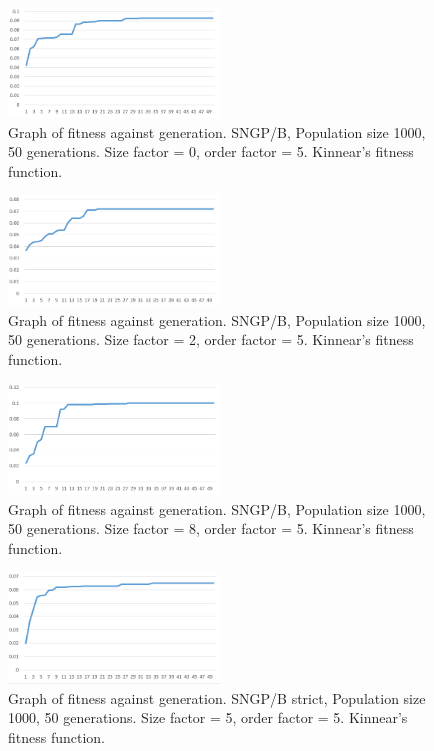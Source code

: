 \documentclass{article}
\begin{document}
    	\begin{figure}[H]
    		\centering
    		\includegraphics[width=0.5\textwidth]{g_sngpb_kinnear_SF0}
    		\caption{Graph of fitness against generation. SNGP/B, Population size 1000, 50 generations. Size factor = 0, order factor = 5. Kinnear's fitness function.}
    		\label{g:sngpb_kinnear_sf0}
    	\end{figure}
    
    	\begin{figure}[H]
    		\centering
    		\includegraphics[width=0.5\textwidth]{g_sngpb_kinnear_sf2}
    		\caption{Graph of fitness against generation. SNGP/B, Population size 1000, 50 generations. Size factor = 2, order factor = 5. Kinnear's fitness function.}
    		\label{g:sngpb_kinnear_sf2}
    	\end{figure}
    
    	\begin{figure}[H]
    		\centering
    		\includegraphics[width=0.5\textwidth]{g_sngpb_kinnear_sf8}
    		\caption{Graph of fitness against generation. SNGP/B, Population size 1000, 50 generations. Size factor = 8, order factor = 5. Kinnear's fitness function.}
    		\label{g:sngpb_kinnear_sf8}
    	\end{figure}
    
    	\begin{figure}[H]
    		\centering
    		\includegraphics[width=0.5\textwidth]{g_sngpb_kinnear_strict}
    		\caption{Graph of fitness against generation. SNGP/B strict, Population size 1000, 50 generations. Size factor = 5, order factor = 5. Kinnear's fitness function.}
    		\label{g:sngpb_kinnear_strict}
    	\end{figure}
    
\end{document}
